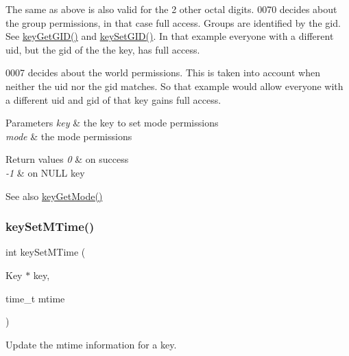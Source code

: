 The same as above is also valid for the 2 other octal digits. 0070 decides about the group permissions, in that case full access. Groups are identified by the gid. See \hyperlink{group__meta_ga46a95e81d7d7f4e3eb59e60e5f3738c0}{key\+Get\+G\+I\+D()} and \hyperlink{group__meta_ga9e3d0fb3f7ba906e067727b9155d22e3}{key\+Set\+G\+I\+D()}. In that example everyone with a different uid, but the gid of the the key, has full access.

0007 decides about the world permissions. This is taken into account when neither the uid nor the gid matches. So that example would allow everyone with a different uid and gid of that key gains full access.


\begin{DoxyParams}{Parameters}
{\em key} & the key to set mode permissions \\
\hline
{\em mode} & the mode permissions \\
\hline
\end{DoxyParams}

\begin{DoxyRetVals}{Return values}
{\em 0} & on success \\
\hline
{\em -\/1} & on N\+U\+LL key \\
\hline
\end{DoxyRetVals}
\begin{DoxySeeAlso}{See also}
\hyperlink{group__meta_gabc0cec592ce3b77e9bc33dbc8e8f6bdc}{key\+Get\+Mode()} 
\end{DoxySeeAlso}
\mbox{\label{group__meta_ga481d8997187992fe4bbf288bc8ef4db7}} 
\subsubsection{\texorpdfstring{key\+Set\+M\+Time()}{keySetMTime()}}
{\footnotesize\ttfamily int key\+Set\+M\+Time (\begin{DoxyParamCaption}\item[{Key $\ast$}]{key,  }\item[{time\+\_\+t}]{mtime }\end{DoxyParamCaption})}



Update the mtime information for a key. 


